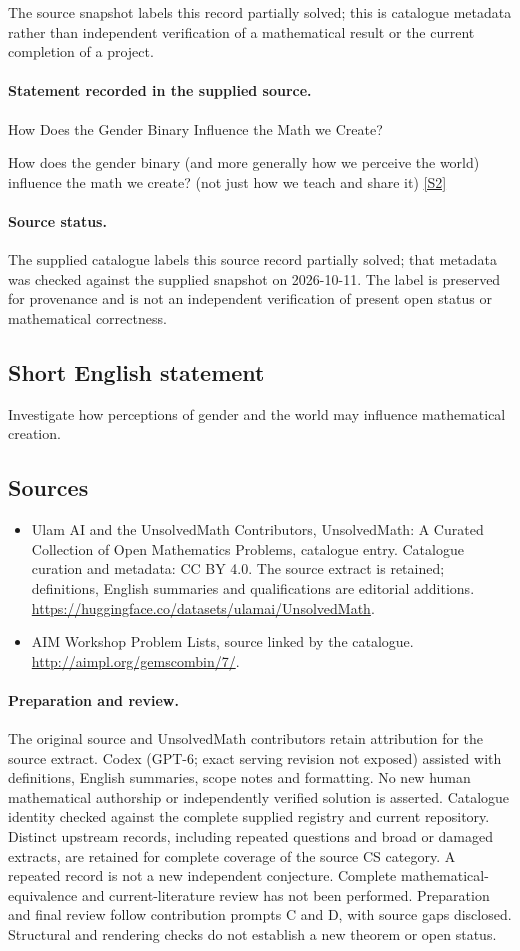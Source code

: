 \documentclass[11pt]{article}
\begin{document}
The source snapshot labels this record partially solved; this is catalogue metadata rather than independent verification of a mathematical result or the current completion of a project.
\paragraph{Statement recorded in the supplied source.}
How Does the Gender Binary Influence the Math we Create?

How does the gender binary (and more generally how we perceive the world) influence the math we create? (not just how we teach and share it) \href{http://aimpl.org/gemscombin/7/}{[S2]}
\paragraph{Source status.}
The supplied catalogue labels this source record partially solved; that metadata was checked against the supplied snapshot on 2026-10-11. The label is preserved for provenance and is not an independent verification of present open status or mathematical correctness.
\subsection{Short English statement}
Investigate how perceptions of gender and the world may influence mathematical creation.
\subsection{Sources}
\begin{itemize}
\item[S1] Ulam AI and the UnsolvedMath Contributors, UnsolvedMath: A Curated Collection of Open Mathematics Problems, catalogue entry. Catalogue curation and metadata: CC BY 4.0. The source extract is retained; definitions, English summaries and qualifications are editorial additions.
\url{https://huggingface.co/datasets/ulamai/UnsolvedMath}.
\item[S2] AIM Workshop Problem Lists, source linked by the catalogue.
\url{http://aimpl.org/gemscombin/7/}.
\end{itemize}
\paragraph{Preparation and review.}
The original source and UnsolvedMath contributors retain attribution for the source extract. Codex (GPT-6; exact serving revision not exposed) assisted with definitions, English summaries, scope notes and formatting. No new human mathematical authorship or independently verified solution is asserted. Catalogue identity checked against the complete supplied registry and current repository. Distinct upstream records, including repeated questions and broad or damaged extracts, are retained for complete coverage of the source CS category. A repeated record is not a new independent conjecture. Complete mathematical-equivalence and current-literature review has not been performed. Preparation and final review follow contribution prompts C and D, with source gaps disclosed. Structural and rendering checks do not establish a new theorem or open status.
\label{end:statement}
\end{document}
